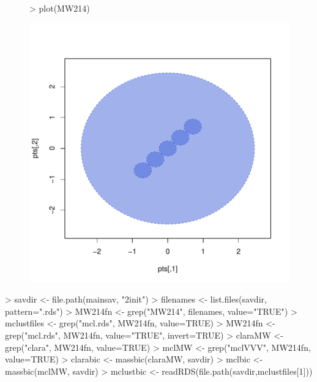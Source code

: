 \begin{figure}[h]
\begin{Schunk}
\begin{Sinput}
>     plot(MW214)
\end{Sinput}
\end{Schunk}
\includegraphics{chapter3-figMW214}
\end{figure}


\begin{Schunk}
\begin{Sinput}
>     savdir <- file.path(mainsav, "2init")
>     filenames <- list.files(savdir, pattern=".rds")
>     MW214fn <- grep("MW214", filenames, value="TRUE")
>     mclustfiles <- grep("mcl.rds", MW214fn, value=TRUE)
>     MW214fn <- grep("mcl.rds", MW214fn, value="TRUE", invert=TRUE)
>     claraMW <- grep("clara", MW214fn, value=TRUE)
>     mclMW <- grep("mclVVV", MW214fn, value=TRUE)
>     clarabic <- massbic(claraMW, savdir)
>     mclbic <- massbic(mclMW, savdir)
>     mclustbic <- readRDS(file.path(savdir,mclustfiles[1]))
\end{Sinput}
\end{Schunk}

